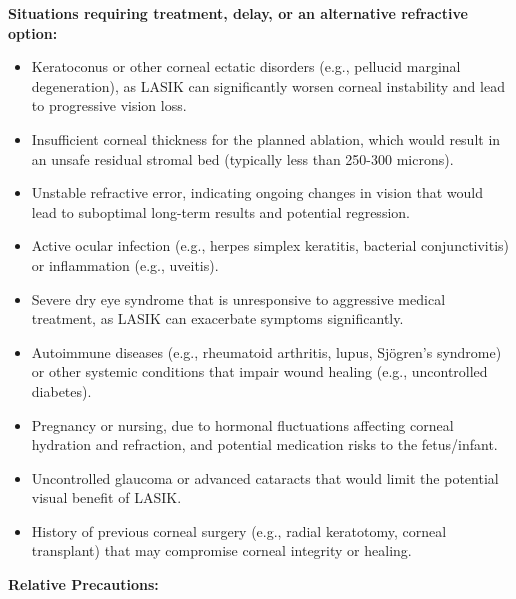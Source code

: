 \textbf{Situations requiring treatment, delay, or an alternative refractive option:}

\begin{itemize}
  \item Keratoconus or other corneal ectatic disorders (e.g., pellucid marginal degeneration), as LASIK can significantly worsen corneal instability and lead to progressive vision loss.
  
  \item Insufficient corneal thickness for the planned ablation, which would result in an unsafe residual stromal bed (typically less than 250-300 microns).
  
  \item Unstable refractive error, indicating ongoing changes in vision that would lead to suboptimal long-term results and potential regression.
  
  \item Active ocular infection (e.g., herpes simplex keratitis, bacterial conjunctivitis) or inflammation (e.g., uveitis).
  
  \item Severe dry eye syndrome that is unresponsive to aggressive medical treatment, as LASIK can exacerbate symptoms significantly.
  
  \item Autoimmune diseases (e.g., rheumatoid arthritis, lupus, Sj\"ogren's syndrome) or other systemic conditions that impair wound healing (e.g., uncontrolled diabetes).
  
  \item Pregnancy or nursing, due to hormonal fluctuations affecting corneal hydration and refraction, and potential medication risks to the fetus/infant.
  
  \item Uncontrolled glaucoma or advanced cataracts that would limit the potential visual benefit of LASIK.
  
  \item History of previous corneal surgery (e.g., radial keratotomy, corneal transplant) that may compromise corneal integrity or healing.
\end{itemize}

\textbf{Relative Precautions:}

